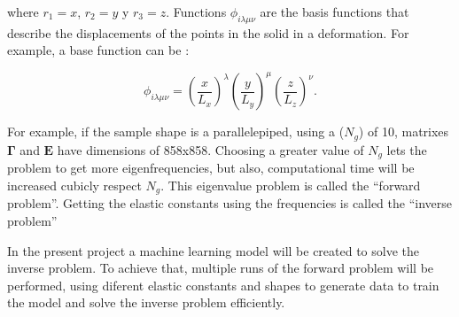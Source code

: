 \documentclass[12pt]{article}
\begin{document}
where $r_1 = x$, $r_2 = y$ y  $r_3 = z$. Functions $\phi_{i \lambda \mu \nu}$ are the basis functions that describe the displacements of the points in the solid in a deformation. For example, a base function can be \cite{Demarest}: 

\begin{equation}
    \phi_{i \lambda \mu \nu} = \left(\frac{x}{L_x} \right)^{\lambda} \left(\frac{y}{L_y} \right)^{\mu} \left(\frac{z}{L_z} \right)^{\nu}.
\end{equation}

For example, if the sample shape is a parallelepiped, using a ($N_g$) of 10, matrixes $\bm{\Gamma}$ and $\bm{E}$ have dimensions of 858x858. Choosing a greater value of $N_g$ lets the problem to get more eigenfrequencies, but also, computational time will be increased cubicly respect $N_g$. This eigenvalue problem is called the ``forward problem''. Getting the elastic constants using the frequencies is called the ``inverse problem'' 

In the present project a machine learning model will be created to solve the inverse problem. To achieve that, multiple runs of the forward problem will be performed, using diferent elastic constants and shapes to generate data to train the model and solve the inverse problem efficiently. 









\vspace{1.5cm}
\end{document}

